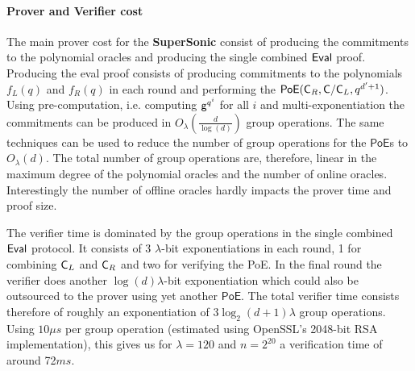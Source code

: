 \paragraph{Prover and Verifier cost}
The main prover cost for the \textsf{\textbf{SuperSonic}} consist of producing the commitments to the polynomial oracles and producing the single combined $\textsf{{Eval}}$ proof.
Producing the eval proof consists of producing commitments to the polynomials $f_L(q)$ and $f_R(q)$ in each round and performing the $\textsf{PoE}(\mathsf{C}_R,\mathsf{C}/\mathsf{C}_L,q^{d'+1})$. Using pre-computation, i.e. computing $\mathsf{g}^{q^i}$ for all $i$ and multi-exponentiation the commitments can be produced in $O_\lambda(\frac{d}{\log(d)})$ group operations. The same techniques can be used to reduce the number of group operations for the $\textsf{PoE}$s to $O_\lambda(d)$. The total number of group operations are, therefore, linear in the maximum degree of the polynomial oracles and the number of online oracles. Interestingly the number of offline oracles hardly impacts the prover time and proof size.
 
 The verifier time is dominated by the group operations in the single combined $\textsf{{Eval}}$ protocol.
It consists of 3 $\lambda$-bit exponentiations in each round, 1 for combining $\mathsf{C}_L$ and $\mathsf{C}_R$ and two for verifying the \textsf{PoE}. In the final round the verifier does another $\log(d)\lambda$-bit exponentiation which could also be outsourced to the prover using yet another $\textsf{PoE}$. The total verifier time consists therefore of roughly an exponentiation of $3 \log_2(d+1) \lambda$ group operations. 
Using $10\mu s$ per group operation (estimated using OpenSSL's 2048-bit RSA implementation), this gives us for $\lambda=120$ and $n=2^{20}$ a verification time of around 72$ms$. 

